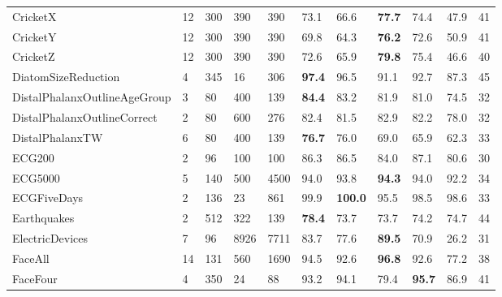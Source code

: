 \documentclass[runningheads]{llncs}
\begin{document}
\begin{table}[t]
\begin{tabular}{>{\tiny}lllll|lllll|l}
		CricketX                     & 12        & 300       & 390     & 390    & 73.1  & 66.6  & \textbf{77.7} & 74.4          & 47.9 & 41          \\
		CricketY                     & 12        & 300       & 390     & 390    & 69.8  & 64.3  & \textbf{76.2} & 72.6          & 50.9 & 41          \\
		CricketZ                     & 12        & 300       & 390     & 390    & 72.6  & 65.9  & \textbf{79.8} & 75.4          & 46.6 & 40          \\
		DiatomSizeReduction          & 4         & 345       & 16      & 306    & \textbf{97.4} & 96.5 & 91.1          & 92.7          & 87.3 & 45          \\
		DistalPhalanxOutlineAgeGroup & 3         & 80        & 400     & 139    & \textbf{84.4} & 83.2 & 81.9          & 81.0          & 74.5 & 32          \\
		DistalPhalanxOutlineCorrect  & 2         & 80        & 600     & 276    & 82.4  & 81.5        & 82.9          & 82.2          & 78.0 & 32          \\
		DistalPhalanxTW              & 6         & 80        & 400     & 139    & \textbf{76.7} & 76.0 & 69.0          & 65.9          & 62.3 & 33          \\
		ECG200                       & 2         & 96        & 100     & 100    & 86.3 & 86.5         & 84.0          & 87.1          & 80.6 & 30          \\
		ECG5000                      & 5         & 140       & 500     & 4500   & 94.0  & 93.8        & \textbf{94.3} & 94.0          & 92.2 & 34          \\
		ECGFiveDays                  & 2         & 136       & 23      & 861    & 99.9 & \textbf{100.0} & 95.5          & 98.5          & 98.6 & 33          \\
		Earthquakes                  & 2         & 512       & 322     & 139    & \textbf{78.4} & 73.7 & 73.7          & 74.2          & 74.7 & 44          \\
		ElectricDevices              & 7         & 96        & 8926    & 7711   & 83.7  & 77.6         & \textbf{89.5} & 70.9          & 26.2 & 31          \\
		FaceAll                      & 14        & 131       & 560     & 1690   & 94.5 & 92.6          & \textbf{96.8} & 92.6          & 77.2 & 38          \\
		FaceFour                     & 4         & 350       & 24      & 88     & 93.2 & 94.1          & 79.4          & \textbf{95.7} & 86.9 & 41          \\

\end{tabular}
\end{table}
\end{document}
